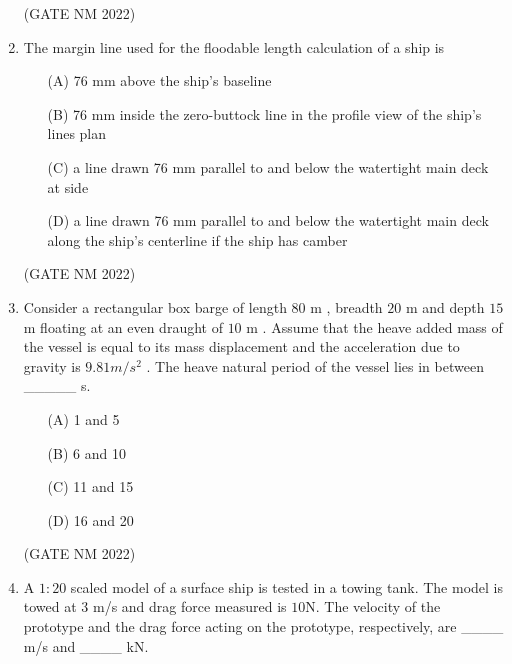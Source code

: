 \documentclass[journal,12pt,onecolumn]{IEEEtran}
\theoremstyle{remark}
\begin{document}
\begin{enumerate}
\hfill (GATE NM 2022)







\item  The margin line used for the floodable length calculation of a ship is

\begin{enumerate}
    \item[(A)] 76 mm above the ship's baseline
    \item[(B)] 76 mm inside the zero-buttock line in the profile view of the ship's lines plan
    \item[(C)] a line drawn 76 mm parallel to and below the watertight main deck at side
    \item[(D)] a line drawn 76 mm parallel to and below the watertight main deck along the ship's centerline if the ship has camber
\end{enumerate}

\hfill (GATE NM 2022)





\item  Consider a rectangular box barge of length $80$ m , breadth $20$ m  and depth $15$ m  floating at an even draught of $10$ m . Assume that the heave added mass of the vessel is equal to its mass displacement and the acceleration due to gravity is $9.81  m/s^2 $ . The heave natural period of the vessel lies in between \_\_\_\_\_  s.

	\begin{multicols}{4}

\begin{enumerate}
    \item[(A)] 1 and 5
    \item[(B)] 6 and 10
    \item[(C)] 11 and 15
    \item[(D)] 16 and 20
\end{enumerate}

	\end{multicols}

\hfill(GATE NM 2022)





\item  A $1{:}20$ scaled model of a surface ship is tested in a towing tank. The model is towed at 3 m/s  and drag force measured is $10$N. The velocity of the prototype and the drag force acting on the prototype, respectively, are \_\_\_\_   m/s and \_\_\_\_   kN.


\end{enumerate}
\end{document}
